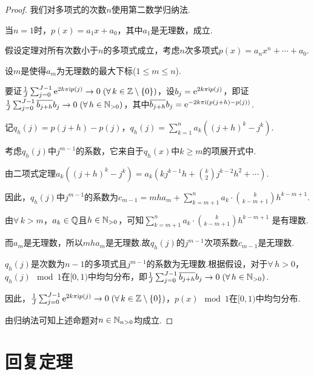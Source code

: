 \begin{proof}
    我们对多项式的次数$n$使用第二数学归纳法.\par
    当$n=1$时，$p(x)=a_1x+a_0$，其中$a_1$是无理数，成立.\par
    假设定理对所有次数小于$n$的多项式成立，考虑$n$次多项式$p(x)=a_nx^n+\cdots+a_0$.\par
    设$m$是使得$a_m$为无理数的最大下标($1\leq m\leq n$).\par
    要证$\frac{1}{J}\sum_{j=0}^{J-1}{\mathrm{e}^{2k\pi \mathrm{i} p(j)}}\to 0\;(\forall\, k\in\mathbb{Z}\setminus\{0\})$，设$b_j=\mathrm{e}^{2k\pi \mathrm{i} p(j)}$，即证$\frac{1}{J}\sum_{j=0}^{J-1}{\overline{b_{j+h}}b_j}\to 0\;(\forall\, h\in\mathbb{N}_{>0})$，其中$\overline{b_{j+h}}b_j=\mathrm{e}^{-2k\pi\mathrm{i}(p(j+h)-p(j))}$. \par
    记$q_h(j)=p(j+h)-p(j)$，$q_h(j)=\sum_{k=1}^n a_k ((j+h)^k - j^k)$.\par
    考虑$q_h(j)$中$j^{m-1}$的系数，它来自于$q_h(x)$中$k\geq m$的项展开式中.\par
    由二项式定理$a_k((j+h)^k - j^k) = a_k\left(kj^{k-1}h + \binom{k}{2}j^{k-2}h^2 + \cdots\right)$.\par
    因此，$q_h(j)$中$j^{m-1}$的系数为$c_{m-1} = mha_m + \sum_{k=m+1}^n a_k \cdot \binom{k}{k-m+1}h^{k-m+1}$.\par
    由$\forall\,k>m$，$a_k\in\mathbb{Q}$且$h\in\mathbb{N}_{>0}$，可知$\sum_{k=m+1}^n a_k \cdot \binom{k}{k-m+1}h^{k-m+1}$ 是有理数.\par
    而$a_m$是无理数，所以$mha_m$是无理数.故$q_h(j)$的$j^{m-1}$次项系数$c_{m-1}$是无理数.\par
    $q_h(j)$是次数为$n-1$的多项式且$j^{m-1}$的系数为无理数.根据假设，对于$\forall\, h>0$，$q_h(j) \mod 1$在$[0,1)$中均匀分布，即$\frac{1}{J}\sum_{j=0}^{J-1}{\overline{b_{j+h}}b_j}\to 0\;(\forall\, h\in\mathbb{N}_{>0})$. \par
    因此，$\frac{1}{J}\sum_{j=0}^{J-1}{\mathrm{e}^{2k\pi \mathrm{i} p(j)}}\to 0\;(\forall\, k\in\mathbb{Z}\setminus\{0\})$，$p(x)\mod 1$在$[0,1)$中均匀分布.\par 
    由归纳法可知上述命题对$n\in\mathbb{N}_{n>0}$均成立.
\end{proof}


\section{回复定理}

